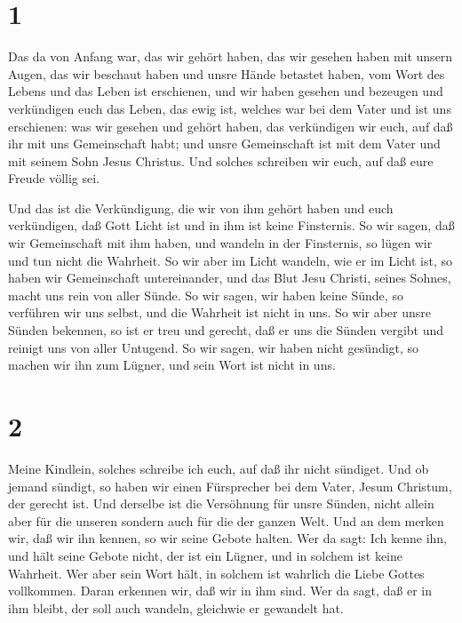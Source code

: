\hypertarget{section}{%
\section{1}\label{section}}

 Das da von Anfang war, das wir gehört haben, das wir
gesehen haben mit unsern Augen, das wir beschaut haben und unsre Hände
betastet haben, vom Wort des Lebens  und das Leben ist
erschienen, und wir haben gesehen und bezeugen und verkündigen euch das
Leben, das ewig ist, welches war bei dem Vater und ist uns erschienen:
 was wir gesehen und gehört haben, das verkündigen wir euch,
auf daß ihr mit uns Gemeinschaft habt; und unsre Gemeinschaft ist mit
dem Vater und mit seinem Sohn Jesus Christus.  Und solches
schreiben wir euch, auf daß eure Freude völlig sei.

 Und das ist die Verkündigung, die wir von ihm gehört haben
und euch verkündigen, daß Gott Licht ist und in ihm ist keine
Finsternis.  So wir sagen, daß wir Gemeinschaft mit ihm
haben, und wandeln in der Finsternis, so lügen wir und tun nicht die
Wahrheit.  So wir aber im Licht wandeln, wie er im Licht
ist, so haben wir Gemeinschaft untereinander, und das Blut Jesu Christi,
seines Sohnes, macht uns rein von aller Sünde.  So wir
sagen, wir haben keine Sünde, so verführen wir uns selbst, und die
Wahrheit ist nicht in uns.  So wir aber unsre Sünden
bekennen, so ist er treu und gerecht, daß er uns die Sünden vergibt und
reinigt uns von aller Untugend.  So wir sagen, wir haben
nicht gesündigt, so machen wir ihn zum Lügner, und sein Wort ist nicht
in uns.

\hypertarget{section-1}{%
\section{2}\label{section-1}}

 Meine Kindlein, solches schreibe ich euch, auf daß ihr
nicht sündiget. Und ob jemand sündigt, so haben wir einen Fürsprecher
bei dem Vater, Jesum Christum, der gerecht ist.  Und
derselbe ist die Versöhnung für unsre Sünden, nicht allein aber für die
unseren sondern auch für die der ganzen Welt.  Und an dem
merken wir, daß wir ihn kennen, so wir seine Gebote halten. 
Wer da sagt: Ich kenne ihn, und hält seine Gebote nicht, der ist ein
Lügner, und in solchem ist keine Wahrheit.  Wer aber sein
Wort hält, in solchem ist wahrlich die Liebe Gottes vollkommen. Daran
erkennen wir, daß wir in ihm sind.  Wer da sagt, daß er in
ihm bleibt, der soll auch wandeln, gleichwie er gewandelt hat.

